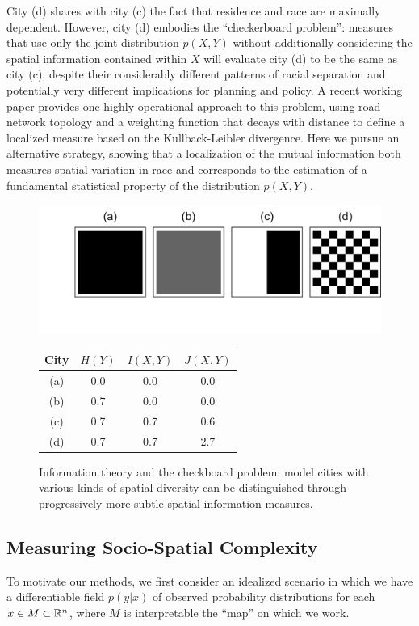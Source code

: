 	City (d) shares with city (c) the fact that residence and race are maximally dependent. However, city (d) embodies the ``checkerboard problem'': measures that use only the joint distribution $p(X,Y)$ without additionally considering the spatial information contained within $X$ will evaluate city (d) to be the same as city (c), despite their considerably different patterns of racial separation and potentially very different implications for planning and policy. A recent working paper \cite{Roberto2015} provides one highly operational approach to this problem, using road network topology and a weighting function that decays with distance to define a localized measure based on the Kullback-Leibler divergence. Here we pursue an alternative strategy, showing that a localization of the mutual information both measures spatial variation in race and corresponds to the estimation of a fundamental statistical property of the distribution $p(X,Y)$. 


	\begin{figure}
		\centering
		  \includegraphics[width=.7\linewidth]{figs/checkerboard.png}
		  \begin{tabular}{c | c c c}
			  City & $H(Y)$ & $I(X,Y)$ & $J(X,Y)$ \\
			  \hline			
			  (a) & 0.0 & 0.0 & 0.0\\
			  (b) & 0.7 & 0.0 & 0.0\\
			  (c) & 0.7 & 0.7 & 0.6\\
			  (d) & 0.7 & 0.7 & 2.7\\
			  \hline  
			\end{tabular}
		\caption{Information theory and the checkboard problem: model cities with various kinds of spatial diversity can be distinguished through progressively more subtle spatial information measures.}
		\label{fig:toy}
		\end{figure}

\subsection{Measuring Socio-Spatial Complexity}
		To motivate our methods, we first consider an idealized scenario in which we have a differentiable field $p(y|x)$ of observed probability distributions for each $x \in M \subset \mathbb{R}^n$, where $M$ is interpretable the ``map'' on which we work. 

